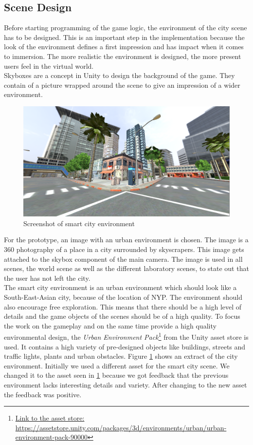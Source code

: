 \subsection{Scene Design}
Before starting programming of the game logic, the environment of the city scene has to be designed. This is an important step in the implementation because the look of the environment defines a first impression and has impact when it comes to immersion. The more realistic the environment is designed, the more present users feel in the virtual world.\\
Skyboxes are a concept in Unity to design the background of the game. They contain of a picture wrapped around the scene to give an impression of a wider environment. \cite{unity.20193}
\begin{figure}[h!]
  \includegraphics[width=16cm]{kapitel/explore-world.PNG}
  \centering
  \caption{Screenshot of smart city environment}
  \label{fig:game-world-scene}
\end{figure}
For the prototype, an image with an urban environment is chosen. The image is a 360 photography of a place in a city surrounded by skyscrapers. This image gets attached to the skybox component of the main camera. The image is used in all scenes, the world scene as well as the different laboratory scenes, to state out that the user has not left the city. \\
The smart city environment is an urban environment which should look like a South-East-Asian city, because of the location of NYP. The environment should also encourage free exploration. This means that there should be a high level of details and the game objects of the scenes should be of a high quality. To focus the work on the gameplay and on the same time provide a high quality environmental design, the \textit{Urban Environment Pack}\footnote{\url{Link to the asset store: https://assetstore.unity.com/packages/3d/environments/urban/urban-environment-pack-90000}} from the Unity asset store is used. It contains a high variety of pre-designed objects like buildings, streets and traffic lights, plants and urban obstacles. Figure \ref{fig:game-world-scene} shows an extract of the city environment. Initially we used a different asset for the smart city scene. We changed it to the asset seen in \ref{fig:game-world-scene} because we got feedback that the previous environment lacks interesting details and variety. After changing to the new asset the feedback was positive.
